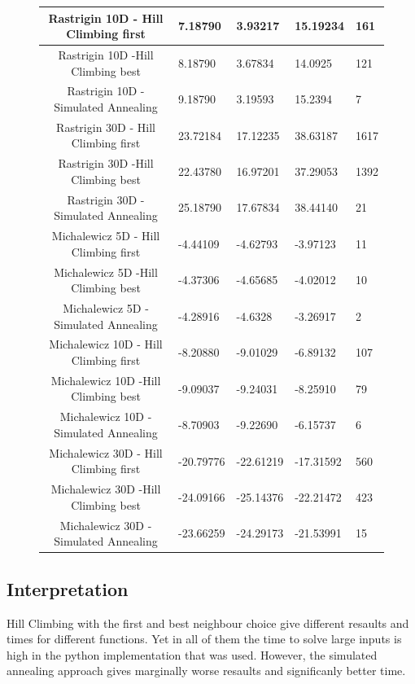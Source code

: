 \documentclass{article}
\begin{document}
\begin{figure}[!h]
\begin{tabular}{||c|||l|l||l||l||}
Rastrigin 10D - Hill Climbing first & 7.18790 & 3.93217 & 15.19234 & 161 \\ \hline
Rastrigin 10D -Hill Climbing  best& 8.18790 & 3.67834 & 14.0925 & 121 \\ \hline
Rastrigin 10D - Simulated Annealing & 9.18790 & 3.19593 & 15.2394 & 7 \\ \hline

Rastrigin  30D - Hill Climbing first & 23.72184 & 17.12235 & 38.63187 & 1617 \\ \hline
Rastrigin  30D -Hill Climbing  best & 22.43780 & 16.97201 & 37.29053 & 1392 \\ \hline
Rastrigin  30D - Simulated Annealing & 25.18790 & 17.67834 & 38.44140 & 21 \\ \hline

Michalewicz 5D - Hill Climbing first & -4.44109 & -4.62793 & -3.97123 & 11 \\ \hline
Michalewicz 5D -Hill Climbing  best & -4.37306 &  -4.65685 & -4.02012 & 10 \\ \hline
Michalewicz 5D - Simulated Annealing & -4.28916 & -4.6328 & -3.26917 & 2 \\ \hline

Michalewicz 10D - Hill Climbing first & -8.20880 & -9.01029 & -6.89132 & 107 \\ \hline
Michalewicz 10D -Hill Climbing  best & -9.09037 &  -9.24031 & -8.25910 & 79 \\ \hline
Michalewicz 10D - Simulated Annealing & -8.70903 & -9.22690 &  -6.15737 & 6 \\ \hline

Michalewicz 30D - Hill Climbing first & -20.79776 & -22.61219 & -17.31592 & 560 \\ \hline
Michalewicz 30D -Hill Climbing  best & -24.09166 & -25.14376 & -22.21472 & 423 \\ \hline
Michalewicz 30D - Simulated Annealing & -23.66259 & -24.29173 & -21.53991 & 15 \\ \hline

  
\end{tabular}
\end{figure}



\subsection{Interpretation}

 Hill Climbing with the first and best neighbour choice give different resaults and times for different functions. Yet in all of them the time to solve large inputs is high in the python implementation that was used.
However, the simulated annealing approach gives marginally worse resaults and significanly better time. 
\end{document}
